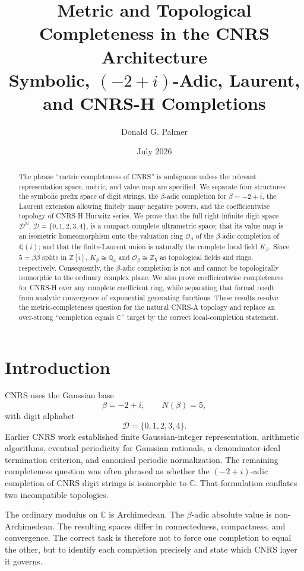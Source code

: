 \documentclass[11pt]{article}
\title{\textbf{Metric and Topological Completeness in the CNRS Architecture}\\
\large Symbolic, \texorpdfstring{$(-2+i)$}{(-2+i)}-Adic, Laurent, and CNRS-H Completions}
\author{Donald G. Palmer}
\date{July 2026}
\newcommand{\Z}{\mathbb Z}
\newcommand{\Q}{\mathbb Q}
\newcommand{\C}{\mathbb C}
\newcommand{\N}{\mathbb N}
\newcommand{\Zi}{\Z[i]}
\newcommand{\Qi}{\Q(i)}
\newcommand{\Db}{\mathcal D}
\newcommand{\Ob}{\mathcal O_\beta}
\newcommand{\Kb}{K_\beta}
\begin{document}
\maketitle

\begin{abstract}
The phrase ``metric completeness of CNRS'' is ambiguous unless the relevant representation space, metric, and value map are specified.  We separate four structures: the symbolic prefix space of digit strings, the $\beta$-adic completion for $\beta=-2+i$, the Laurent extension allowing finitely many negative powers, and the coefficientwise topology of CNRS-H Hurwitz series.  We prove that the full right-infinite digit space $\Db^{\N}$, $\Db=\{0,1,2,3,4\}$, is a compact complete ultrametric space; that its value map is an isometric homeomorphism onto the valuation ring $\Ob$ of the $\beta$-adic completion of $\Qi$; and that the finite-Laurent union is naturally the complete local field $\Kb$.  Since $5=\beta\overline\beta$ splits in $\Zi$, $\Kb\cong\Q_5$ and $\Ob\cong\Z_5$ as topological fields and rings, respectively.  Consequently, the $\beta$-adic completion is not and cannot be topologically isomorphic to the ordinary complex plane.  We also prove coefficientwise completeness for CNRS-H over any complete coefficient ring, while separating that formal result from analytic convergence of exponential generating functions.  These results resolve the metric-completeness question for the natural CNRS-A topology and replace an over-strong ``completion equals $\C$'' target by the correct local-completion statement.
\end{abstract}

\section{Introduction}

CNRS uses the Gaussian base
\[
\beta=-2+i,\qquad N(\beta)=5,
\]
with digit alphabet
\[
\Db=\{0,1,2,3,4\}.
\]
Earlier CNRS work established finite Gaussian-integer representation, arithmetic algorithms, eventual periodicity for Gaussian rationals, a denominator-ideal termination criterion, and canonical periodic normalization.  The remaining completeness question was often phrased as whether the $(-2+i)$-adic completion of CNRS digit strings is isomorphic to $\C$.  That formulation conflates two incompatible topologies.

The ordinary modulus on $\C$ is Archimedean.  The $\beta$-adic absolute value is non-Archimedean.  The resulting spaces differ in connectedness, compactness, and convergence.  The correct task is therefore not to force one completion to equal the other, but to identify each completion precisely and state which CNRS layer it governs.
\end{document}
